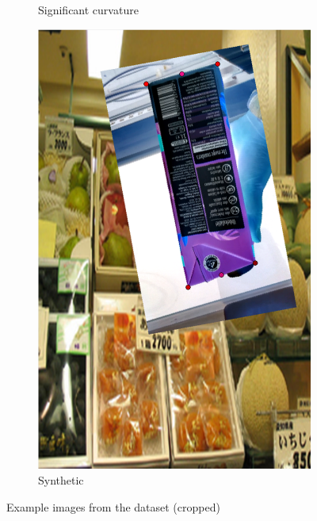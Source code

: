 \documentclass[a4paper,11pt]{report}
\begin{document}
\begin{figure}[h]
\begin{subfigure}{0.45\textwidth}
                        \caption{Significant curvature}
                        \label{fig:full_image_example_1}
                    \end{subfigure}
                    \hfill
                    \begin{subfigure}{0.45\textwidth}
                        \centering
                        \includegraphics[width=\textwidth]{synthetic_image_example_1.png}
                        \caption{Synthetic}
                        \label{fig:synthetic_image_example_1}
                    \end{subfigure}
                    \caption{Example images from the dataset (cropped)}
                    \label{fig:subsection-examples}
                \end{figure}
                 
\end{document}

